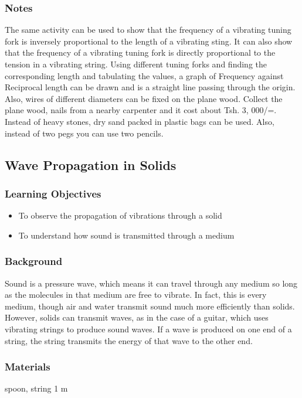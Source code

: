 \subsubsection*{Notes}
The same activity can be used to show that the frequency of a vibrating tuning fork is inversely proportional to the length of a vibrating sting. It can also show that the frequency of a vibrating tuning fork is directly proportional to the tension in a vibrating string. Using different tuning forks and finding the corresponding length and tabulating the values, a graph of Frequency against Reciprocal length can be drawn and is a straight line passing through the origin. Also, wires of different diameters can be fixed on the plane wood. Collect the plane wood, nails from a nearby carpenter and it cost about Tsh.  3, 000/=. Instead of heavy stones, dry sand packed in plastic bags can be used. Also, instead of two pegs you can use two pencils.  

\subsection{Wave Propagation in Solids}

\subsubsection*{Learning Objectives}
\begin{itemize}
\item{To observe the propagation of vibrations through a solid}
\item{To understand how sound is transmitted through a medium}
\end{itemize}

\subsubsection*{Background}
Sound is a pressure wave, which means it can travel through any medium so long as the molecules in that medium are free to vibrate.  In fact, this is every medium, though air and water transmit sound much more efficiently than solids.  However, solids can transmit waves, as in the case of a guitar, which uses vibrating strings to produce sound waves.
If a wave is produced on one end of a string, the string transmits the energy of that wave to the other end.

\subsubsection*{Materials}
spoon, string 1 m

